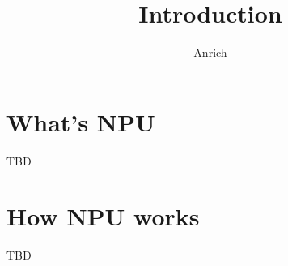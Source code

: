 \documentclass[a4paper,1r21pt]{article}
\author{Anrich}
\title{Introduction}
\begin{document}
\maketitle
\tableofcontents
\section{What's NPU}
TBD
\section{How NPU works}
TBD
\end{document}
